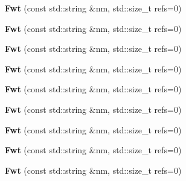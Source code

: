 \begin{DoxyCompactItemize}
{\bfseries Fwt} (const std\+::string \&nm, std\+::size\+\_\+t refs=0)
\item 
\mbox{\label{class_fwt_a7db10f89a88f66e80260857ae61b7ef4}} 
{\bfseries Fwt} (const std\+::string \&nm, std\+::size\+\_\+t refs=0)
\item 
\mbox{\label{class_fwt_a7db10f89a88f66e80260857ae61b7ef4}} 
{\bfseries Fwt} (const std\+::string \&nm, std\+::size\+\_\+t refs=0)
\item 
\mbox{\label{class_fwt_a7db10f89a88f66e80260857ae61b7ef4}} 
{\bfseries Fwt} (const std\+::string \&nm, std\+::size\+\_\+t refs=0)
\item 
\mbox{\label{class_fwt_a7db10f89a88f66e80260857ae61b7ef4}} 
{\bfseries Fwt} (const std\+::string \&nm, std\+::size\+\_\+t refs=0)
\item 
\mbox{\label{class_fwt_a7db10f89a88f66e80260857ae61b7ef4}} 
{\bfseries Fwt} (const std\+::string \&nm, std\+::size\+\_\+t refs=0)
\item 
\mbox{\label{class_fwt_a7db10f89a88f66e80260857ae61b7ef4}} 
{\bfseries Fwt} (const std\+::string \&nm, std\+::size\+\_\+t refs=0)
\item 
\mbox{\label{class_fwt_a7db10f89a88f66e80260857ae61b7ef4}} 
{\bfseries Fwt} (const std\+::string \&nm, std\+::size\+\_\+t refs=0)
\item 
\mbox{\label{class_fwt_a7db10f89a88f66e80260857ae61b7ef4}} 
{\bfseries Fwt} (const std\+::string \&nm, std\+::size\+\_\+t refs=0)
\end{DoxyCompactItemize}


